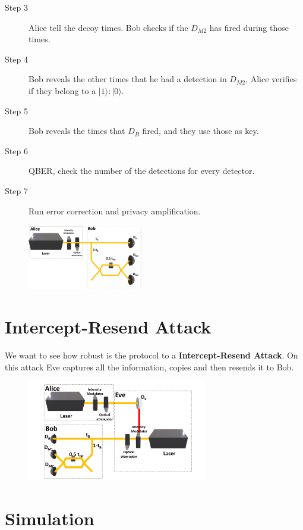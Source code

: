 \documentclass[1000pt]{article}
\newcommand{\mysection}[1]{\section*{\color{black}\sffamily #1}}%
\begin{document}
\begin{description}

\item [Step 3] Alice tell the decoy times. Bob checks if the \textbf{$D_{M2}$} has fired during those times.

\item [Step 4] Bob reveals the other times that he had a detection in \textbf{$D_{M2}$}, Alice verifies if they belong to a $|1\rangle:|0\rangle$.

\item [Step 5] Bob reveals the times that $D_B$ fired, and they use those as key.

\item [Step 6] QBER, check the number of the detections for every detector.

\item [Step 7] Run error correction and privacy amplification.
\end{description}
\begin{figure}[hbt]
    	\centering
    	\includegraphics[width=0.45\textwidth]{./figures/Full2.pdf}
    \end{figure}

\mysection{\Huge\textbf{Intercept-Resend Attack}} \Large \vspace*{1cm}

We want to see how robust is the protocol to a \textbf{Intercept-Resend Attack}. On this attack Eve captures all the information, copies and then resends it to Bob.

\begin{figure}[hbt]
    	\centering
    	\includegraphics[width=0.7\textwidth]{./figures/E.pdf}
\end{figure}
\mysection{\Huge\textbf{Simulation}} \Large \vspace*{1cm}
\end{document}
